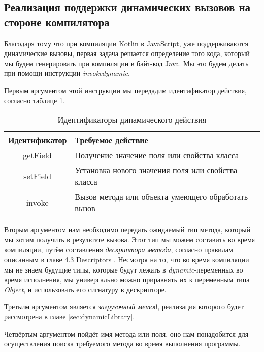 \subsection{Реализация поддержки динамических вызовов на стороне компилятора}
\label{sec:compileRealization}

Благодаря тому что при компиляции Kotlin в JavaScript, уже поддерживаются динамические вызовы, первая задача решается определение того кода, который мы будем генерировать при компиляции в байт-код Java. Мы это будем делать при помощи инструкции \textit{invokedynamic}.


Первым аргументом этой инструкции мы передадим идентификатор действия, согласно таблице \ref{tab:DynamicCallType}. 

\begin{table}[h]
\caption{\label{tab:DynamicCallType}Идентификаторы динамического действия}
\begin{center}
\begin{tabular}{|c|l|}
\hline
Идентификатор	& Требуемое действие \\
\hline
getField & Получение значение поля или свойства класса  \\
setField & Установка нового значения поля или свойства класса	\\
invoke   & Вызов метода или объекта умеющего обработать вызов  \\
\hline
\end{tabular}
\end{center}
\end{table} 

Вторым аргументом нам необходимо передать ожидаемый тип метода, который мы хотим получить в результате вызова. Этот тип мы можем составить во время компиляции, путём составления \textit{дескриптора метода}, согласно правилам описанным в главе 4.3 Descriptors \cite{book:yellin1996java}. Несмотря на то, что во время компиляции мы не знаем будущие типы, которые будут лежать в \textit{dynamic}-переменных во время исполнения, мы универсально можно приравнять их к переменным типа \textit{Object}, и использовать его сигнатуру в дескрипторе.

Третьим аргументом является \textit{загрузочный метод}, реализация которого будет рассмотрена в главе \ref{sec:dynamicLibrary}.

Четвёртым аргументом пойдёт имя метода или поля, оно нам понадобится для осуществления поиска требуемого метода во время выполнения программы.

